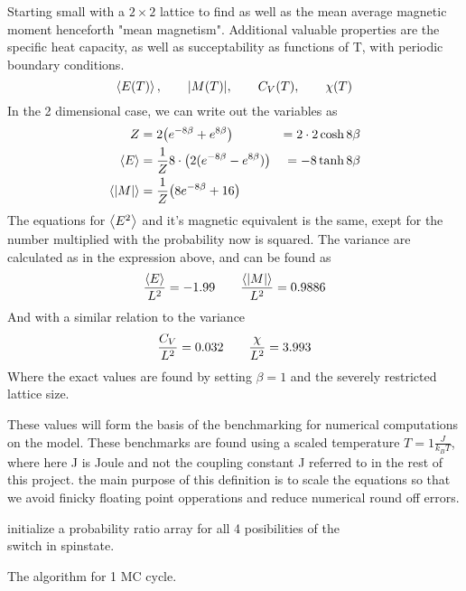 \documentclass[10pt, twocolumn]{revtex4-1}
\begin{document}
Starting small with a $2\times 2$ lattice to find as well as the mean average magnetic moment henceforth "mean magnetism". Additional valuable
properties are the specific heat capacity, as well as succeptability as functions of T, with periodic boundary conditions.
\[
    \ev{E(T)}, \qq{} \abs{M(T)}, \qq{} C_V(T), \qq{} \chi(T)
\] %
In the 2 dimensional case, we can write out the variables as
\begin{align*}
    Z &= 2\qty( e^{-8\beta} + e^{8\beta} )
    &= 2\cdot 2\cosh{8\beta} \\
    \ev{E} &= \frac{1}{Z} 8\cdot \qty( 2(e^{-8\beta} - e^{8\beta}) )
    &= -8\tanh{8\beta} \\
    \ev{|M|} &= \frac{1}{Z} \qty( 8 e^{-8\beta} + 16 )
\end{align*}
The equations for $\ev{E^2}$ and it's magnetic equivalent is the same, exept for the number multiplied with the probability now is squared. The
variance are calculated as in the expression above, and can be found as\cite{Anna}
\[ \frac{\ev{E}}{L^2} = -1.99 \qq{} \frac{\ev{|M|}}{L^2} = 0.9886 \]
And with a similar relation to the variance
\[\frac{C_V}{L^2} = 0.032 \qq{} \frac{\chi}{L^2} = 3.993 \]
Where the exact values are found by setting $\beta=1$ and the severely restricted lattice size.

These values will form the basis of the benchmarking for numerical computations on the model. These benchmarks are found using a scaled temperature
$T=1 \frac{J}{k_B T}$, where here J is Joule and not the coupling constant J referred to in the rest of this project. the main purpose of this definition
is to scale the equations so that we avoid finicky floating point opperations and reduce numerical round off errors.
\begin{algorithm}
    initialize a probability ratio array for all 4 posibilities of the\\
    switch in spinstate. \\
    \caption{The algorithm for 1 MC cycle. }
\end{algorithm}
\end{document}

